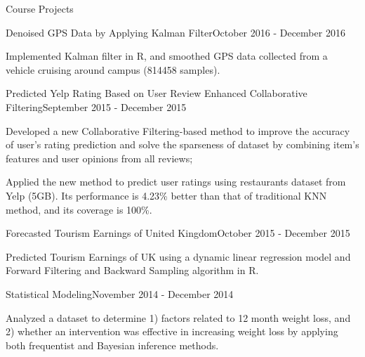 \documentclass{my_resume} %
\begin{document}
\begin{rSection}{Course Projects}

\begin{rSubsection}{Denoised GPS Data by Applying Kalman Filter}{}{October
    2016 - December 2016}
  \item Implemented Kalman filter in R, and smoothed GPS data collected from a
  vehicle cruising around campus (814458 samples).
\end{rSubsection}

\begin{rSubsection}{Predicted Yelp Rating Based on User Review Enhanced
  Collaborative Filtering}{}{September 2015 - December 2015}
  \item Developed a new Collaborative Filtering-based method to improve the
    accuracy of user's rating prediction and solve the sparseness of dataset by
    combining item's features and user opinions from all reviews;
  \item Applied the new method to predict user ratings using restaurants dataset
    from Yelp (5GB). Its performance is 4.23\% better than that of traditional KNN
    method, and its coverage is 100\%.
\end{rSubsection}

\begin{rSubsection}{Forecasted Tourism Earnings of United Kingdom}{}{October
  2015 - December 2015}
  \item Predicted Tourism Earnings of UK using a dynamic linear
    regression model and Forward Filtering and Backward Sampling algorithm in
    R.
\end{rSubsection}

\begin{rSubsection}{Statistical Modeling}{}{November 2014 - December 2014}
  \item Analyzed a dataset to determine 1) factors related to 12 month weight
  loss, and 2) whether an intervention was effective in increasing weight loss by
  applying both frequentist and Bayesian inference methods.
\end{rSubsection}
\end{rSection}

\end{document}
